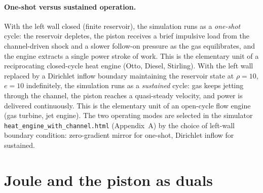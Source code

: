 \paragraph{One-shot versus sustained operation.}
With the left wall closed (finite reservoir), the simulation runs as a
\emph{one-shot} cycle: the reservoir depletes, the piston receives a
brief impulsive load from the channel-driven shock and a slower
follow-on pressure as the gas equilibrates, and the engine extracts a
single power stroke of work. This is the elementary unit of a
reciprocating closed-cycle heat engine (Otto, Diesel, Stirling).
With the left wall replaced by a Dirichlet inflow boundary maintaining
the reservoir state at $\rho = 10$, $e = 10$ indefinitely, the
simulation runs as a \emph{sustained} cycle: gas keeps jetting through
the channel, the piston reaches a quasi-steady velocity, and power is
delivered continuously. This is the elementary unit of an open-cycle
flow engine (gas turbine, jet engine). The two operating modes are
selected in the simulator \texttt{heat\_engine\_with\_channel.html}
(Appendix~A) by the choice of left-wall boundary condition: zero-gradient
mirror for one-shot, Dirichlet inflow for sustained.

\section{Joule and the piston as duals}\label{sec:joule-piston-duals}

